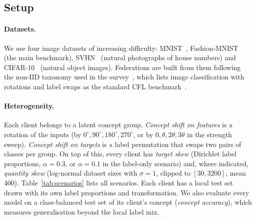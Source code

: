 \subsection{Setup}\label{sec:setup}
\paragraph{Datasets.} We use four image datasets of increasing difficulty: MNIST~\citep{lecun1998mnist}, Fashion-MNIST~\citep{xiao2017fmnist} (the main benchmark), SVHN~\citep{netzer2011svhn} (natural photographs of house numbers) and CIFAR-10~\citep{krizhevsky2009cifar} (natural object images). Federations are built from them following the non-IID taxonomy used in the survey~\citep{benali2026survey}, which lists image classification with rotations and label swaps as the standard CFL benchmark~\citep[Table~6]{benali2026survey}.

\paragraph{Heterogeneity.} Each client belongs to a latent concept group. \emph{Concept shift on features} is a rotation of the inputs (by $0^\circ,90^\circ,180^\circ,270^\circ$, or by $0,\theta,2\theta,3\theta$ in the strength sweep). \emph{Concept shift on targets} is a label permutation that swaps two pairs of classes per group. On top of this, every client has \emph{target skew} (Dirichlet label proportions, $\alpha=0.3$, or $\alpha=0.1$ in the label-only scenario) and, where indicated, \emph{quantity skew} (log-normal dataset sizes with $\sigma=1$, clipped to $[30,3200]$, mean 400). Table~\ref{tab:scenarios} lists all scenarios. Each client has a local test set drawn with its own label proportions and transformation. We also evaluate every model on a class-balanced test set of its client's concept (\emph{concept accuracy}), which measures generalisation beyond the local label mix.

